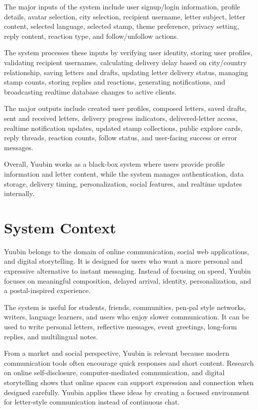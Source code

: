 ﻿\documentclass[12pt,a4paper]{report}
\begin{document}
The major inputs of the system include user signup/login information, profile details, avatar selection, city selection, recipient username, letter subject, letter content, selected language, selected stamp, theme preference, privacy setting, reply content, reaction type, and follow/unfollow actions.

The system processes these inputs by verifying user identity, storing user profiles, validating recipient usernames, calculating delivery delay based on city/country relationship, saving letters and drafts, updating letter delivery status, managing stamp counts, storing replies and reactions, generating notifications, and broadcasting realtime database changes to active clients.

The major outputs include created user profiles, composed letters, saved drafts, sent and received letters, delivery progress indicators, delivered-letter access, realtime notification updates, updated stamp collections, public explore cards, reply threads, reaction counts, follow status, and user-facing success or error messages.

Overall, Yuubin works as a black-box system where users provide profile information and letter content, while the system manages authentication, data storage, delivery timing, personalization, social features, and realtime updates internally.

\section{System Context}

Yuubin belongs to the domain of online communication, social web applications, and digital storytelling. It is designed for users who want a more personal and expressive alternative to instant messaging. Instead of focusing on speed, Yuubin focuses on meaningful composition, delayed arrival, identity, personalization, and a postal-inspired experience.

The system is useful for students, friends, communities, pen-pal style networks, writers, language learners, and users who enjoy slower communication. It can be used to write personal letters, reflective messages, event greetings, long-form replies, and multilingual notes.

From a market and social perspective, Yuubin is relevant because modern communication tools often encourage quick responses and short content. Research on online self-disclosure, computer-mediated communication, and digital storytelling shows that online spaces can support expression and connection when designed carefully. Yuubin applies these ideas by creating a focused environment for letter-style communication instead of continuous chat.
\end{document}
